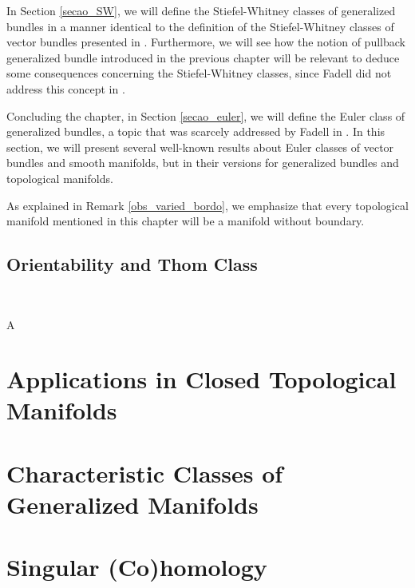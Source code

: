 \documentclass[12pt,oneside]{book}
\begin{document}
    In Section \ref{secao_SW}, we will define the Stiefel-Whitney classes of generalized bundles in a manner identical to the definition of 
    the Stiefel-Whitney classes of vector bundles presented in \cite{milnor_1}. Furthermore, we will see how the notion 
    of pullback generalized bundle introduced in the previous chapter will be relevant to deduce some consequences concerning the 
    Stiefel-Whitney classes, since Fadell did not address this concept in \cite{fadell_1}.
    
    Concluding the chapter, in Section \ref{secao_euler}, we will define the Euler class of generalized bundles, a topic that was scarcely 
    addressed by Fadell in \cite{fadell_1}. In this section, we will present several well-known results about Euler classes of vector 
    bundles and smooth manifolds, but in their versions for generalized bundles and topological manifolds.
    
    As explained in Remark \ref{obs_varied_bordo}, we emphasize that every topological manifold mentioned in this chapter will be a 
    manifold without boundary.
    


    \section{Orientability and Thom Class}\label{secao_thom}

    \

    A







    \chapter{Applications in Closed Topological Manifolds}\label{cap_aplic}
    \thispagestyle{empty}



    \chapter{Characteristic Classes of Generalized Manifolds}\label{cap_wu_gen}
    \thispagestyle{empty}



    \appendix

    \chapter{Singular (Co)homology}\label{ap_(co)_sing}
    \thispagestyle{empty}
\end{document}
